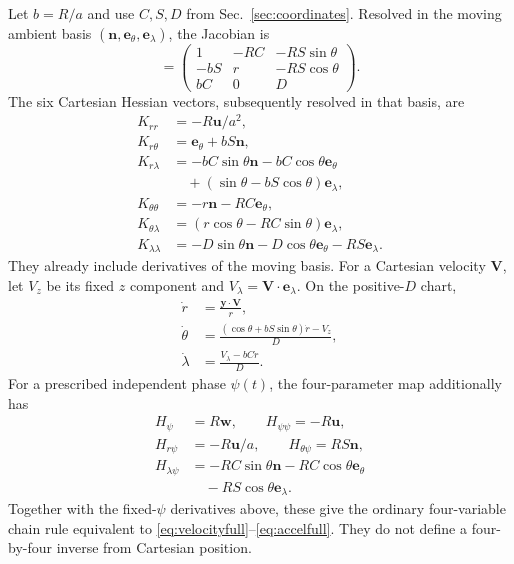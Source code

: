 \documentclass[11pt]{article}
\newcommand{\n}{\bm n}
\newcommand{\uu}{\bm u}
\newcommand{\ww}{\bm w}
\newcommand{\et}{\bm e_\theta}
\newcommand{\el}{\bm e_\lambda}
\begin{document}
Let $b=R/a$ and use $C,S,D$ from Sec.~\ref{sec:coordinates}. Resolved in the moving ambient basis $(\n,\et,\el)$, the Jacobian is
\begin{equation}
 [J_r\ J_\theta\ J_\lambda]=
 \begin{pmatrix}
 1&-RC&-RS\sin\theta\\
 -bS&r&-RS\cos\theta\\
 bC&0&D
 \end{pmatrix}.
 \label{eq:J}
\end{equation}
The six Cartesian Hessian vectors, subsequently resolved in that basis, are
\begin{equation}
 \begin{aligned}
 K_{rr}&=-R\uu/a^2,\\
 K_{r\theta}&=\et+bS\n,\\
 K_{r\lambda}&=-bC\sin\theta\n-bC\cos\theta\et\\
 &\quad+(\sin\theta-bS\cos\theta)\el,\\
 K_{\theta\theta}&=-r\n-RC\et,\\
 K_{\theta\lambda}&=(r\cos\theta-RC\sin\theta)\el,\\
 K_{\lambda\lambda}&=-D\sin\theta\n-D\cos\theta\et-RS\el.
 \end{aligned}
 \label{eq:K}
\end{equation}
They already include derivatives of the moving basis. For a Cartesian velocity $\bm V$, let $V_z$ be its fixed $z$ component and $V_\lambda=\bm V\cdot\el$. On the positive-$D$ chart,
\begin{equation}
 \begin{aligned}
 \dot r&=\frac{\bm y\cdot\bm V}{r},\\
 \dot\theta&=\frac{(\cos\theta+bS\sin\theta)\dot r-V_z}{D},\\
 \dot\lambda&=\frac{V_\lambda-bC\dot r}{D}.
 \end{aligned}
\end{equation}
For a prescribed independent phase $\psi(t)$, the four-parameter map additionally has
\begin{equation}
 \begin{aligned}
 H_\psi&=R\ww,\qquad H_{\psi\psi}=-R\uu,\\
 H_{r\psi}&=-R\uu/a,\qquad H_{\theta\psi}=RS\n,\\
 H_{\lambda\psi}&=-RC\sin\theta\n-RC\cos\theta\et\\
 &\quad-RS\cos\theta\el.
 \end{aligned}
 \label{eq:phasederivatives}
\end{equation}
Together with the fixed-$\psi$ derivatives above, these give the ordinary four-variable chain rule equivalent to \eqref{eq:velocityfull}--\eqref{eq:accelfull}. They do not define a four-by-four inverse from Cartesian position.
\end{document}

